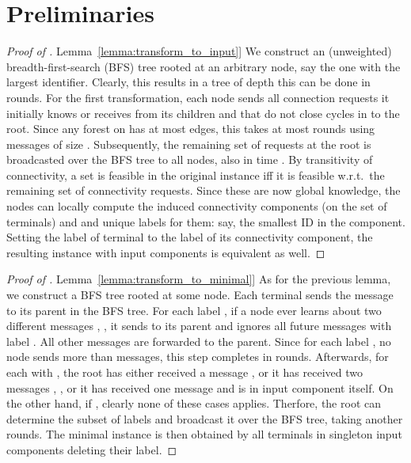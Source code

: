 \documentclass[letterpaper,11pt]{article}
\newcommand{\namedref}[2]{\hyperref[#2]{#1~\ref*{#2}}}
\newcommand{\lemmaref}[1]{\namedref{Lemma}{#1}}
\begin{document}
\section{Preliminaries}
\begin{proof}[Proof of \lemmaref{lemma:transform_to_input}]
  We construct an (unweighted) breadth-first-search (BFS) tree rooted at
an arbitrary node, say the one with the largest identifier. Clearly,
this results in a tree of depth  this can be done in 
rounds. For the first transformation, each node sends all connection
requests it initially knows or receives from its children and that do
not close cycles in  to the root. Since any forest on  has at
most  edges, this takes at most  rounds using messages
of size . Subsequently, the remaining set of requests at
the root is broadcasted over the BFS tree to all nodes, also in time
. By transitivity of connectivity, a set  is feasible in
the original instance iff it is feasible w.r.t.\ the remaining set of
connectivity requests. Since these are now global knowledge, the nodes
can locally compute the induced connectivity components (on the set of
terminals) and and unique labels for them: say, the smallest ID in the
component. Setting the label of
terminal  to the label of its connectivity component, the resulting
instance with input components is equivalent as well. 
\end{proof}
\begin{proof}[Proof of \lemmaref{lemma:transform_to_minimal}]
As for the previous lemma, we construct a BFS tree rooted at some
node. Each terminal sends the message  to its parent in the
BFS tree. For each label , if a node ever learns about two
different messages , , it sends  to
its parent and ignores all future messages with label . All other
messages are forwarded to the parent. Since for each label , no
node sends more than  messages, this step completes in 
rounds. Afterwards, for each  with , the root
has either received a message , or it has received two messages
, , or it has received one message  and is
in input component  itself. On the other hand, if
, clearly none of these cases applies. Therfore, the
root can determine the subset of labels  and broadcast it over the BFS tree,
taking another  rounds. The minimal instance is then
obtained by all terminals in singleton input components deleting their
label. 
\end{proof}
\end{document}
